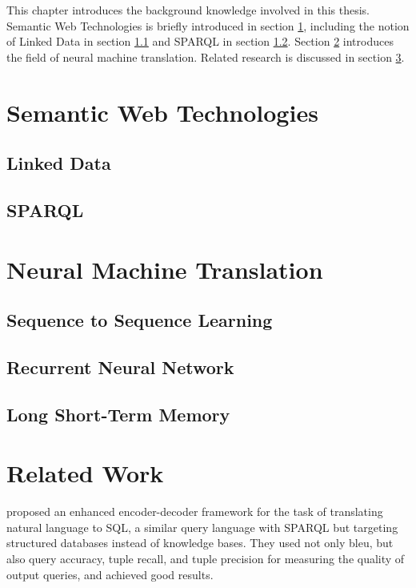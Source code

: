 
This chapter introduces the background knowledge involved in this thesis. Semantic Web Technologies is briefly introduced in section \ref{section:semantic web technologies}, including the notion of Linked Data in section \ref{subsection:linked data} and SPARQL in section \ref{subsection:sparql}. Section \ref{section:neural machine translation} introduces the field of neural machine translation. Related research is discussed in section \ref{section:related work}.

\section{Semantic Web Technologies} \label{section:semantic web technologies}

\subsection{Linked Data} \label{subsection:linked data}


\subsection{SPARQL} \label{subsection:sparql}


\section{Neural Machine Translation} \label{section:neural machine translation}
\subsection{Sequence to Sequence Learning}
\subsection{Recurrent Neural Network}
\subsection{Long Short-Term Memory}

\section{Related Work} \label{section:related work}

\cite{Cai2017} proposed an enhanced encoder-decoder framework for the task of translating natural language to SQL, a similar query language with SPARQL but targeting structured databases instead of knowledge bases. They used not only bleu, but also query accuracy, tuple recall, and tuple precision for measuring the quality of output queries, and achieved good results.

